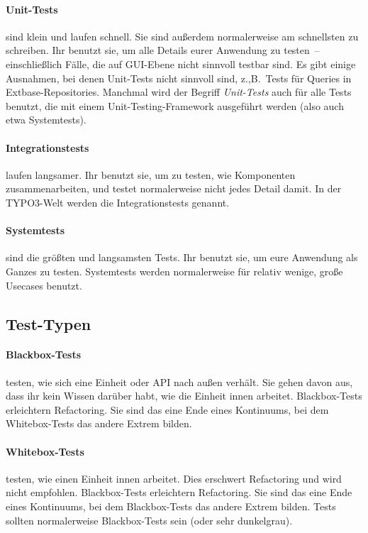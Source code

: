 \documentclass[a4paper,11pt,headsepline]{scrartcl}
\begin{document}
\paragraph{Unit-Tests} sind klein und laufen schnell. Sie sind außerdem normalerweise am schnellsten zu schreiben. Ihr benutzt sie, um alle Details eurer Anwendung zu testen~-- einschließlich Fälle, die auf GUI-Ebene nicht sinnvoll testbar sind. Es gibt einige Ausnahmen, bei denen Unit-Tests nicht sinnvoll sind, z.,B.~Tests für Queries in Extbase-Repositories. Manchmal wird der Begriff \emph{Unit-Tests} auch für alle Tests benutzt, die mit einem Unit-Testing-Framework ausgeführt werden (also auch etwa Systemtests).

\paragraph{Integrationstests} laufen langsamer. Ihr benutzt sie, um zu testen, wie Komponenten zusammenarbeiten, und testet normalerweise nicht jedes Detail damit. In der TYPO3-Welt werden die Integrationstests  genannt.

\paragraph{Systemtests} sind die größten und langsamsten Tests. Ihr benutzt sie, um eure Anwendung als Ganzes zu testen. Systemtests werden normalerweise für relativ wenige, große Usecases benutzt.


\subsection{Test-Typen}

\paragraph{Blackbox-Tests} testen, wie sich eine Einheit oder API nach außen verhält. Sie gehen davon aus, dass ihr kein Wissen darüber habt, wie die Einheit innen arbeitet. Blackbox-Tests erleichtern Refactoring. Sie sind das eine Ende eines Kontinuums, bei dem Whitebox-Tests das andere Extrem bilden.

\paragraph{Whitebox-Tests} testen, wie einen Einheit innen arbeitet. Dies erschwert Refactoring und wird nicht empfohlen. Blackbox-Tests erleichtern Refactoring. Sie sind das eine Ende eines Kontinuums, bei dem Blackbox-Tests das andere Extrem bilden. Tests sollten normalerweise Blackbox-Tests sein (oder sehr dunkelgrau).
\end{document}
